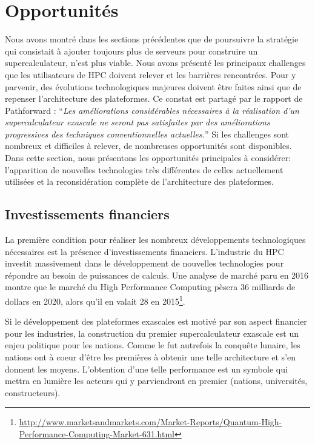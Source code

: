 \section{Opportunités}\label{sec:oppo}
    
    Nous avons montré dans les sections précédentes que de poursuivre la stratégie qui consistait à ajouter toujours plus de serveurs pour construire un supercalculateur, n'est plus viable. Nous avons présenté les principaux challenges que les utilisateurs de HPC doivent relever et les barrières rencontrées. Pour y parvenir, des évolutions technologiques majeures doivent être faites ainsi que de repenser l'architecture des plateformes.
    Ce constat est partagé par le rapport de Pathforward \cite{Lucas2014}: ``\textit{Les améliorations considérables nécessaires à la réalisation d'un supercalculateur \gls{exascale} ne seront pas satisfaites par des améliorations progressives des techniques conventionnelles actuelles.}''
    Si les challenges sont nombreux et difficiles à relever, de nombreuses opportunités sont disponibles. Dans cette section, nous présentons les opportunités principales à considérer: l'apparition de nouvelles technologies très différentes de celles actuellement utilisées et la reconsidération complète de l'architecture des plateformes. 


\subsection{Investissements financiers}

    La première condition pour réaliser les nombreux développements technologiques nécessaires est la présence d'investissements financiers. L'industrie du HPC investit massivement dans le développement de nouvelles technologies pour répondre au besoin de puissances de calculs. Une analyse de marché paru en 2016 montre que le marché du High Performance Computing pèsera 36 milliards de dollars en 2020, alors qu'il en valait 28 en 2015\footnote{\url{http://www.marketsandmarkets.com/Market-Reports/Quantum-High-Performance-Computing-Market-631.html}}.

    Si le développement des plateformes exascales est motivé par son aspect financier pour les industries, la construction du premier supercalculateur exascale est un enjeu politique pour les nations. Comme le fut autrefois la conquête lunaire, les nations ont à coeur d’être les premières à obtenir une telle architecture et s’en donnent les moyens. L’obtention d’une telle performance est un symbole qui mettra en lumière les acteurs qui y parviendront en premier (nations, universités, constructeurs).

